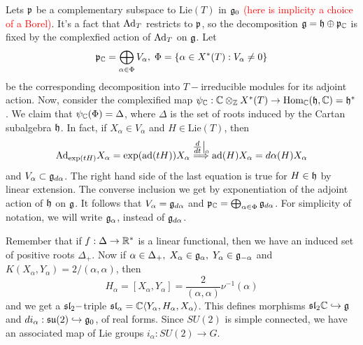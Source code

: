 Lets $\mathfrak{p}$ be a complementary subspace to $\text{Lie}(T)$ in $\mathfrak{g}_0$ 
\textcolor{red}{(here is implicity a choice of a Borel)}. It's a fact that 
$\text{Ad}_T$ restricts to $\mathfrak{p}$, so the decomposition $\mathfrak{g}=\mathfrak{h}\oplus \mathfrak{p}_{\mathbb{C}}$ is fixed 
by the complexfied action of $\text{Ad}_T$ on $\mathfrak{g}$. Let 
\begin{equation}
    \mathfrak{p}_{\mathbb{C}}=\bigoplus_{\alpha\in \Phi}V_\alpha,\; \Phi=\{\alpha\in X^*(T):V_\alpha\neq0\} 
\end{equation}
be the corresponding decomposition into $T-$irreducible modules for its adjoint action. Now, consider the complexified 
map $\psi_{\mathbb{C}}:\mathbb{C}\otimes_{\mathbb{Z}}X^*(T)\to \text{Hom}_{\mathbb{C}}(\mathfrak{h},\mathbb{C})=\mathfrak{h}^*$. We claim that 
$\psi_{\mathbb{C}}(\Phi)=\Delta$, where $\Delta$ is the set of roots induced by the Cartan subalgebra $\mathfrak{h}$. 
In fact, if $X_\alpha\in V_\alpha$ and $H\in\text{Lie}(T)$, then
\begin{equation}
    \text{Ad}_{\exp(tH)}X_\alpha=\exp(\text{ad}(tH))X_\alpha\overset{\tfrac{d}{dt}\big|_0}{\Longrightarrow} 
    \text{ad}(H)X_\alpha=d\alpha(H)X_\alpha
\end{equation}
and $V_\alpha\subset \mathfrak{g}_{d\alpha}$. The right hand side of the last equation is true for $H\in\mathfrak{h}$ by linear 
extension. The converse inclusion we get by exponentiation of the adjoint action of 
$\mathfrak{h}$ on $\mathfrak{g}$. It follows that $V_\alpha=\mathfrak{g}_{d\alpha}$ 
and $\mathfrak{p}_{\mathbb{C}}=\bigoplus_{\alpha\in\Phi}\mathfrak{g}_{d\alpha}$. For simplicity of notation, we will write 
$\mathfrak{g}_\alpha$, instead of $\mathfrak{g}_{d\alpha}$.\par 

Remember that if $f:\Delta\to\mathbb{R}^*$ is a linear functional, then we have an induced set of positive roots $\Delta_+$. 
Now if $\alpha\in \Delta_+,\; X_{\alpha}\in\mathfrak{g}_{\alpha},\; Y_{\alpha}\in\mathfrak{g}_{-\alpha}$ and 
$K(X_\alpha,Y_\alpha)=2/(\alpha,\alpha)$, then 
\begin{equation}
    H_\alpha = [X_\alpha,Y_\alpha]= \frac{2}{(\alpha,\alpha)}\nu^{-1}(\alpha)
\end{equation} 
and we get a $\mathfrak{sl}_2-$triple $\mathfrak{sl}_\alpha=\mathbb{C}\langle Y_\alpha,H_\alpha,X_\alpha\rangle$. This defines morphisms 
$\mathfrak{sl}_2\mathbb{C}\hookrightarrow\mathfrak{g}$ and $di_\alpha:\mathfrak{su}(2)\hookrightarrow\mathfrak{g}_0$, of real forms. Since 
$SU(2)$ is simple connected, we have an associated map of Lie groups $i_\alpha:SU(2)\to G$.

